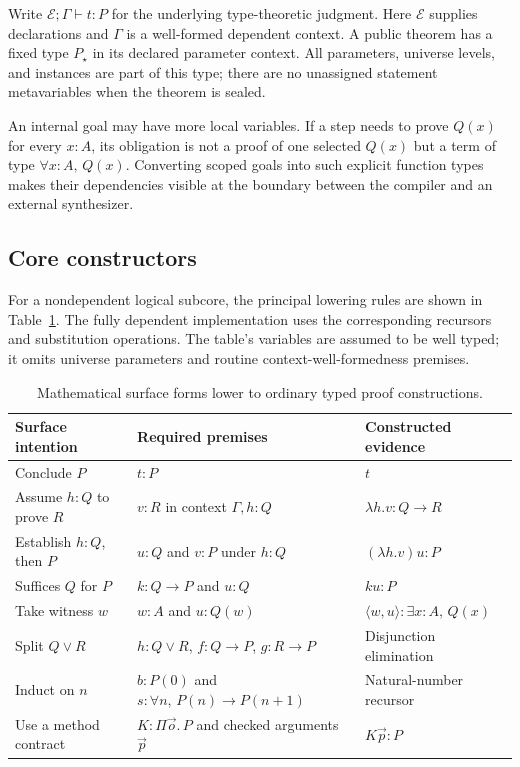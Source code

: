 \documentclass[11pt,a4paper]{article}
\newcommand{\Env}{\mathcal E}
\theoremstyle{remark}
\begin{document}
Write $\Env;\Gamma\vdash t:P$ for the underlying type-theoretic judgment. Here $\Env$ supplies declarations and $\Gamma$ is a well-formed dependent context. A public theorem has a fixed type $P_\star$ in its declared parameter context. All parameters, universe levels, and instances are part of this type; there are no unassigned statement metavariables when the theorem is sealed.

An internal goal may have more local variables. If a step needs to prove $Q(x)$ for every $x:A$, its obligation is not a proof of one selected $Q(x)$ but a term of type $\forall x:A,\,Q(x)$. Converting scoped goals into such explicit function types makes their dependencies visible at the boundary between the compiler and an external synthesizer.

\subsection{Core constructors}

For a nondependent logical subcore, the principal lowering rules are shown in Table~\ref{tab:core}. The fully dependent implementation uses the corresponding recursors and substitution operations. The table's variables are assumed to be well typed; it omits universe parameters and routine context-well-formedness premises.

\begin{table}[htbp]
\centering\small
\begin{tabularx}{\textwidth}{@{}p{}Xp{}@{}}
\toprule
Surface intention & Required premises & Constructed evidence \\
\midrule
Conclude $P$ & $t:P$ & $t$ \\
Assume $h:Q$ to prove $R$ & $v:R$ in context $\Gamma,h:Q$ & $\lambda h.v:Q\to R$ \\
Establish $h:Q$, then $P$ & $u:Q$ and $v:P$ under $h:Q$ & $(\lambda h.v)u:P$ \\
Suffices $Q$ for $P$ & $k:Q\to P$ and $u:Q$ & $ku:P$ \\
Take witness $w$ & $w:A$ and $u:Q(w)$ & $\langle w,u\rangle:\exists x:A,\,Q(x)$ \\
Split $Q\lor R$ & $h:Q\lor R$, $f:Q\to P$, $g:R\to P$ & Disjunction elimination \\
Induct on $n$ & $b:P(0)$ and $s:\forall n,\,P(n)\to P(n+1)$ & Natural-number recursor \\
Use a method contract & $K:\Pi\vec o.\,P$ and checked arguments $\vec p$ & $K\vec p:P$ \\
\bottomrule
\end{tabularx}
\caption{Mathematical surface forms lower to ordinary typed proof constructions.}
\label{tab:core}
\end{table}
\end{document}
